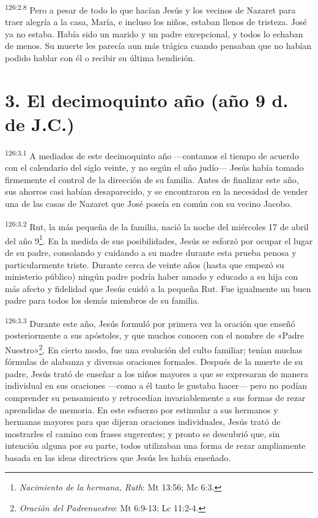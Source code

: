 \par
\textsuperscript{126:2.8} Pero a pesar de todo lo que hacían Jesús y los vecinos de Nazaret para traer alegría a la casa, María, e incluso los niños, estaban llenos de tristeza. José ya no estaba. Había sido un marido y un padre excepcional, y todos lo echaban de menos. Su muerte les parecía aun más trágica cuando pensaban que no habían podido hablar con él o recibir su última bendición.

\section*{3. El decimoquinto año (año 9 d. de J.C.)}
\par
\textsuperscript{126:3.1} A mediados de este decimoquinto año ---contamos el tiempo de acuerdo con el calendario del siglo veinte, y no según el año judío--- Jesús había tomado firmemente el control de la dirección de su familia. Antes de finalizar este año, sus ahorros casi habían desaparecido, y se encontraron en la necesidad de vender una de las casas de Nazaret que José poseía en común con su vecino Jacobo.

\par
\textsuperscript{126:3.2} Rut, la más pequeña de la familia, nació la noche del miércoles 17 de abril del año 9\footnote{\textit{Nacimiento de la hermana, Ruth}: Mt 13:56; Mc 6:3.}. En la medida de sus posibilidades, Jesús se esforzó por ocupar el lugar de su padre, consolando y cuidando a su madre durante esta prueba penosa y particularmente triste. Durante cerca de veinte años (hasta que empezó su ministerio público) ningún padre podría haber amado y educado a su hija con más afecto y fidelidad que Jesús cuidó a la pequeña Rut. Fue igualmente un buen padre para todos los demás miembros de su familia.

\par
\textsuperscript{126:3.3} Durante este año, Jesús formuló por primera vez la oración que enseñó posteriormente a sus apóstoles, y que muchos conocen con el nombre de «Padre Nuestro»\footnote{\textit{Oración del Padrenuestro}: Mt 6:9-13; Lc 11:2-4.}. En cierto modo, fue una evolución del culto familiar; tenían muchas fórmulas de alabanza y diversas oraciones formales. Después de la muerte de su padre, Jesús trató de enseñar a los niños mayores a que se expresaran de manera individual en sus oraciones ---como a él tanto le gustaba hacer--- pero no podían comprender su pensamiento y retrocedían invariablemente a sus formas de rezar aprendidas de memoria. En este esfuerzo por estimular a sus hermanos y hermanas mayores para que dijeran oraciones individuales, Jesús trató de mostrarles el camino con frases sugerentes; y pronto se descubrió que, sin intención alguna por su parte, todos utilizaban una forma de rezar ampliamente basada en las ideas directrices que Jesús les había enseñado.

